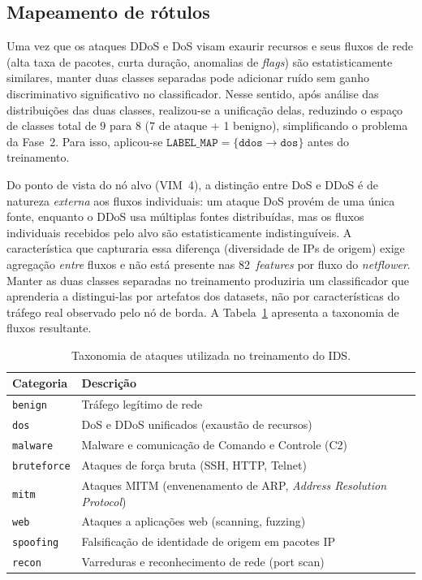 \documentclass[12pt,a4paper]{article}
\begin{document}
\subsection{Mapeamento de rótulos}
\label{subsec:rotulos}

Uma vez que os ataques DDoS e DoS visam exaurir recursos e seus fluxos de rede
(alta taxa de pacotes, curta duração, anomalias de \textit{flags}) são
estatisticamente similares, manter duas classes separadas pode adicionar ruído
sem ganho discriminativo significativo no classificador. Nesse sentido, após
análise das distribuições das duas classes, realizou-se a unificação delas,
reduzindo o espaço de classes total de 9 para 8 (7 de ataque + 1 benigno),
simplificando o problema da Fase~2. Para isso, aplicou-se
$\texttt{LABEL\_MAP} = \{\texttt{ddos} \rightarrow \texttt{dos}\}$ antes do
treinamento.

Do ponto de vista do nó alvo (VIM~4), a distinção entre DoS e DDoS é de natureza
\textit{externa} aos fluxos individuais: um ataque DoS provém de uma única fonte,
enquanto o DDoS usa múltiplas fontes distribuídas, mas os fluxos individuais
recebidos pelo alvo são estatisticamente indistinguíveis. A característica que
capturaria essa diferença (diversidade de IPs de origem) exige agregação
\textit{entre} fluxos e não está presente nas 82~\textit{features} por fluxo do
\textit{netflower}. Manter as duas classes separadas no treinamento produziria
um classificador que aprenderia a distingui-las por artefatos dos datasets, não
por características do tráfego real observado pelo nó de borda. A
Tabela~\ref{tab:taxonomy} apresenta a taxonomia de fluxos resultante.

\begin{table}[ht]
\centering
\caption{Taxonomia de ataques utilizada no treinamento do IDS.}
\label{tab:taxonomy}
\begin{tabular}{@{}ll@{}}
\toprule
\textbf{Categoria} & \textbf{Descrição} \\ \midrule
\texttt{benign}     & Tráfego legítimo de rede \\
\texttt{dos}        & DoS e DDoS unificados (exaustão de recursos) \\
\texttt{malware}    & Malware e comunicação de Comando e Controle (C2) \\
\texttt{bruteforce} & Ataques de força bruta (SSH, HTTP, Telnet) \\
\texttt{mitm}       & Ataques MITM (envenenamento de ARP, \textit{Address Resolution Protocol}) \\
\texttt{web}        & Ataques a aplicações web (scanning, fuzzing) \\
\texttt{spoofing}   & Falsificação de identidade de origem em pacotes IP \\
\texttt{recon}      & Varreduras e reconhecimento de rede (port scan) \\ \bottomrule
\end{tabular}
\end{table}
\end{document}
